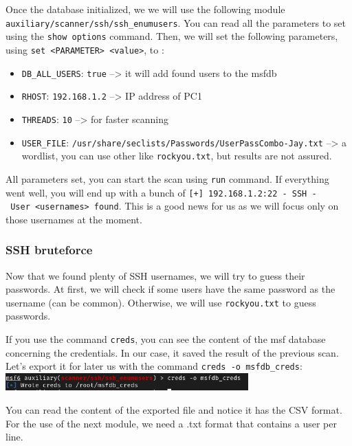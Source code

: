 \documentclass[a4paper,11pt,singlespacing]{article}
\providecommand{\tightlist}{%
  \setlength{\itemsep}{0pt}\setlength{\parskip}{0pt}}
\begin{document}
Once the database initialized, we we will use the following module
\texttt{auxiliary/scanner/ssh/ssh\_enumusers}. You can read all the
parameters to set using the \texttt{show\ options} command. Then, we
will set the following parameters, using
\texttt{set\ \textless{}PARAMETER\textgreater{}\ \textless{}value\textgreater{}},
to :

\begin{itemize}
\tightlist
\item
  \texttt{DB\_ALL\_USERS}: \texttt{true} --\textgreater{} it will add
  found users to the msfdb
\item
  \texttt{RHOST}: \texttt{192.168.1.2} --\textgreater{} IP address of
  PC1
\item
  \texttt{THREADS}: \texttt{10} --\textgreater{} for faster scanning
\item
  \texttt{USER\_FILE}:
  \texttt{/usr/share/seclists/Passwords/UserPassCombo-Jay.txt}
  --\textgreater{} a wordlist, you can use other like
  \texttt{rockyou.txt}, but results are not assured.
\end{itemize}

All parameters set, you can start the scan using \texttt{run} command.
If everything went well, you will end up with a bunch of
\texttt{{[}+{]}\ 192.168.1.2:22\ -\ SSH\ -\ User\ \textless{}usernames\textgreater{}\ found}.
This is a good news for us as we will focus only on those usernames at
the moment.

\subsubsection{SSH bruteforce}\label{ssh-bruteforce}

Now that we found plenty of SSH usernames, we will try to guess their
passwords. At first, we will check if some users have the same password
as the username (can be common). Otherwise, we will use
\texttt{rockyou.txt} to guess passwords.

If you use the command \texttt{creds}, you can see the content of the
msf database concerning the credentials. In our case, it saved the
result of the previous scan. Let's export it for later us with the
command \texttt{creds\ -o\ msfdb\_creds}:
\includegraphics[width=0.7\textwidth,height=0.7\textheight]{./Images/Image01.png}

You can read the content of the exported file and notice it has the CSV
format. For the use of the next module, we need a .txt format that
contains a user per line.
\end{document}
